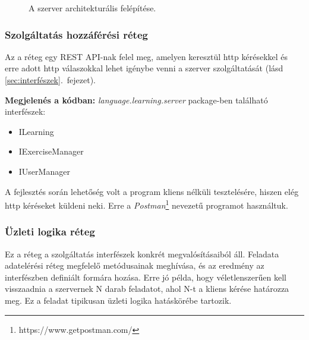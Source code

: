 \documentclass[11pt, a4paper]{article}
\begin{document}
    \begin{figure}[htbp]
    	\center
    	\caption{A szerver architekturális felépítése.}
    	\label{fig:server_arch}
    \end{figure}
    
    \subsubsection{Szolgáltatás hozzáférési réteg}
    Az a réteg egy REST API-nak felel meg, amelyen keresztül http kérésekkel és erre adott http válaszokkal lehet igénybe venni a szerver szolgáltatását (lásd \ref{sec:interfészek}.~fejezet).
    
    \textbf{Megjelenés a kódban:} \textit{language.learning.server} package-ben található interfészek: 
    \begin{itemize}
    	\item ILearning
    	\item IExerciseManager
    	\item IUserManager
    \end{itemize}
    
    A fejlesztés során lehetőség volt a program kliens nélküli tesztelésére, hiszen elég http kéréseket küldeni neki. Erre a \textit{Postman}\footnote{https://www.getpostman.com/} nevezetű programot használtuk.
    
    \subsubsection{Üzleti logika réteg}
    Ez a réteg a szolgáltatás interfészek konkrét megvalósításaiból áll. Feladata adatelérési réteg megfelelő metódusainak meghívása, és az eredmény az interfészben definiált formára hozása. Erre jó példa, hogy véletlenszerűen kell visszaadnia a szervernek N darab feladatot, ahol N-t a kliens kérése határozza meg. Ez a feladat tipikusan üzleti logika hatáskörébe tartozik.
    
\end{document}
